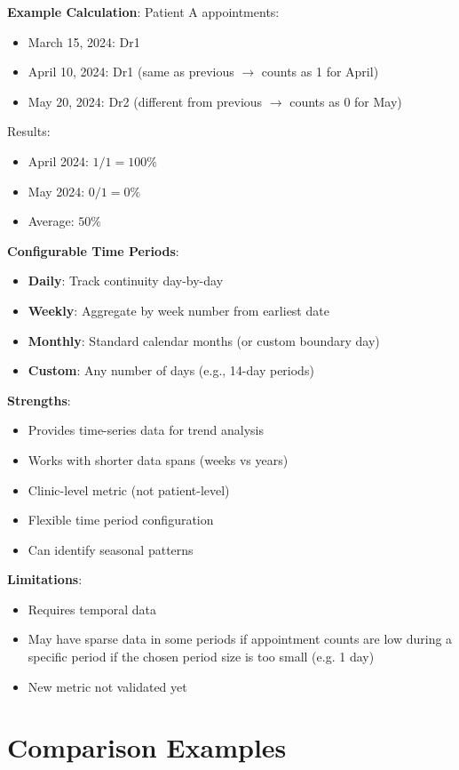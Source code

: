 \documentclass[11pt,a4paper]{article}
\begin{document}
\textbf{Example Calculation}:
Patient A appointments:
\begin{itemize}
\item March 15, 2024: Dr1
\item April 10, 2024: Dr1 (same as previous $\rightarrow$ counts as 1 for April)
\item May 20, 2024: Dr2 (different from previous $\rightarrow$ counts as 0 for May)
\end{itemize}

Results:
\begin{itemize}
\item April 2024: $1/1 = 100\%$
\item May 2024: $0/1 = 0\%$
\item Average: $50\%$
\end{itemize}

\textbf{Configurable Time Periods}:
\begin{itemize}
\item \textbf{Daily}: Track continuity day-by-day
\item \textbf{Weekly}: Aggregate by week number from earliest date
\item \textbf{Monthly}: Standard calendar months (or custom boundary day)
\item \textbf{Custom}: Any number of days (e.g., 14-day periods)
\end{itemize}

\textbf{Strengths}:
\begin{itemize}
\item Provides time-series data for trend analysis
\item Works with shorter data spans (weeks vs years)
\item Clinic-level metric (not patient-level)
\item Flexible time period configuration
\item Can identify seasonal patterns
\end{itemize}

\textbf{Limitations}:
\begin{itemize}
\item Requires temporal data
\item May have sparse data in some periods if appointment counts are low during a specific period if the chosen period size is too small (e.g. 1 day)
\item New metric not validated yet
\end{itemize}

\section{Comparison Examples}
\end{document}
